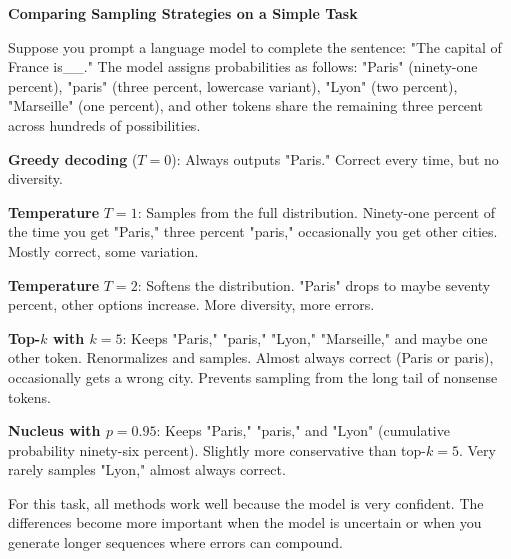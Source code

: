 \vspace{1.5em}

\begin{examplebox}
\textbf{Comparing Sampling Strategies on a Simple Task}

\vspace{0.5em}

Suppose you prompt a language model to complete the sentence: "The capital of France is\_\_." The model assigns probabilities as follows: "Paris" (ninety-one percent), "paris" (three percent, lowercase variant), "Lyon" (two percent), "Marseille" (one percent), and other tokens share the remaining three percent across hundreds of possibilities.

\vspace{0.5em}

\textbf{Greedy decoding} ($T = 0$): Always outputs "Paris." Correct every time, but no diversity.

\vspace{0.5em}

\textbf{Temperature} $T = 1$: Samples from the full distribution. Ninety-one percent of the time you get "Paris," three percent "paris," occasionally you get other cities. Mostly correct, some variation.

\vspace{0.5em}

\textbf{Temperature} $T = 2$: Softens the distribution. "Paris" drops to maybe seventy percent, other options increase. More diversity, more errors.

\vspace{0.5em}

\textbf{Top-$k$ with $k = 5$}: Keeps "Paris," "paris," "Lyon," "Marseille," and maybe one other token. Renormalizes and samples. Almost always correct (Paris or paris), occasionally gets a wrong city. Prevents sampling from the long tail of nonsense tokens.

\vspace{0.5em}

\textbf{Nucleus with $p = 0.95$}: Keeps "Paris," "paris," and "Lyon" (cumulative probability ninety-six percent). Slightly more conservative than top-$k = 5$. Very rarely samples "Lyon," almost always correct.

\vspace{0.5em}

For this task, all methods work well because the model is very confident. The differences become more important when the model is uncertain or when you generate longer sequences where errors can compound.
\end{examplebox}

